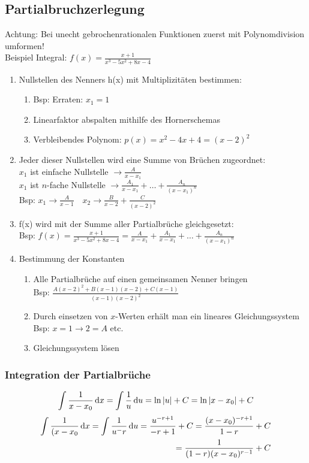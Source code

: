 \subsection{Partialbruchzerlegung}
Achtung: Bei unecht gebrochenrationalen Funktionen zuerst mit Polynomdivision umformen! \\
Beispiel Integral: $f(x) = \frac{x + 1}{x^3 - 5x^2 + 8x -4}$
\begin{enumerate}
  \item Nullstellen des Nenners h(x) mit Multiplizitäten bestimmen: 
    \begin{enumerate}
      \item Bsp: Erraten: $x_1 = 1$
      \item Linearfaktor abspalten mithilfe des Hornerschemas
      \item Verbleibendes Polynom: $p(x) = x^2 -4x + 4 = (x-2)^2$
    \end{enumerate}
  \item Jeder dieser Nullstellen wird eine Summe von Brüchen zugeordnet: \\
    $x_1$ ist einfache Nullstelle $\rightarrow \frac{A}{x - x_1}$ \\
    $x_1$ ist $n$-fache Nullstelle $\rightarrow \frac{A_1}{x - x_1} + \dots + \frac{A_n}{(x-x_1)^n}$ \\
    Bsp: $x_1 \rightarrow \frac{A}{x-1} \quad x_2 \rightarrow \frac{B}{x-2} + \frac{C}{(x-2)^2}$
  \item f(x) wird mit der Summe aller Partialbrüche gleichgesetzt: \\
    Bsp: $f(x) = \frac{x+1}{x^3 - 5x^2 + 8x -4} = \frac{A}{x - x_1} + \frac{A_1}{x - x_1} + \dots + \frac{A_n}{(x-x_1)^n}$
  \item Bestimmung der Konstanten
    \begin{enumerate}
      \item Alle Partialbrüche auf einen gemeinsamen Nenner bringen \\
        Bsp: $\frac{A(x-2)^2 + B(x-1)(x-2) + C(x-1)}{(x-1)(x-2)^2}$
      \item Durch einsetzen von $x$-Werten erhält man ein lineares Gleichungssystem \\
        Bsp: $x = 1 \rightarrow 2 = A$ etc.
      \item Gleichungssystem lösen
    \end{enumerate}
\end{enumerate}

\subsubsection{Integration der Partialbrüche}%
\label{ssub:Integration der Partialbrüche}
\begin{equation*}
  \int \frac{1}{x-x_0} \mathop{}\!\mathrm{d} x = \int \frac{1}{u} \mathop{}\!\mathrm{d} u = \ln |u| + C = \ln |x-x_0| + C
\end{equation*}
\begin{align*}
  \int \frac{1}{(x-x_0} \mathop{}\!\mathrm{d} x = \int \frac{1}{u^-r} \mathop{}\!\mathrm{d} u = \frac{u^{-r+1}}{-r + 1} + C = \frac{(x-x_0)^{-r+1}}{1-r}+C \\ 
  = \frac{1}{(1-r)(x-x_0)^{r-1}}+C
\end{align*}

